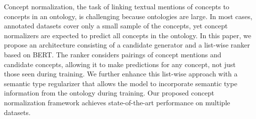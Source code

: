 Concept normalization, the task of linking textual mentions of concepts to concepts in an ontology, is challenging because ontologies are large. In most cases, annotated datasets cover only a small sample of the concepts, yet concept normalizers are expected to predict all concepts in the ontology. In this paper, we propose an architecture consisting of a candidate generator and a list-wise ranker based on BERT. The ranker considers pairings of concept mentions and candidate concepts, allowing it to make predictions for any concept, not just those seen during training. We further enhance this list-wise approach with a semantic type regularizer that allows the model to incorporate semantic type information from the ontology during training. Our proposed concept normalization framework achieves state-of-the-art performance on multiple datasets.
